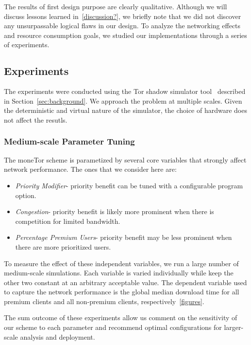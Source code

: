 The results of first design purpose are clearly qualitative. Although we will
discuss lessons learned in~\ref{discussion?}, we briefly note that we did not
discover any unsurpassable logical flaws in our design. To analyze the networking
effects and resource consumption goals, we studied our implementations through a
series of experiments.

\subsection{Experiments}

The experiments were conducted using the Tor shadow simulator
tool~\cite{jansen2011shadow} described in Section~\ref{sec:background}. We
approach the problem at multiple scales. Given the deterministic and virtual
nature of the simulator, the choice of hardware does not affect the resutls.

\subsubsection{Medium-scale Parameter Tuning}

The moneTor scheme is parametized by several core variables that strongly affect
network performance. The ones that we consider here are:

\begin{itemize}
\item \emph{Priority Modifier}- priority benefit can be tuned with a configurable
  program option.
\item \emph{Congestion}- priority benefit is likely more prominent when there is
  competition for limited bandwidth.
\item \emph{Percentage Premium Users}- priority benefit may be less prominent
  when there are more prioritized users.
\end{itemize}

To measure the effect of these independent variables, we run a large number of
medium-scale simulations. Each variable is varied individually while keep the
other two constant at an arbitrary acceptable value. The dependent variable used
to capture the network performance is the global median download time for all
premium clients and all non-premium clients,
respectively~\ref{figures}.


The sum outcome of these experiments allow us comment on the sensitivity of our
scheme to each parameter and recommend optimal configurations for larger-scale
analysis and deployment.


